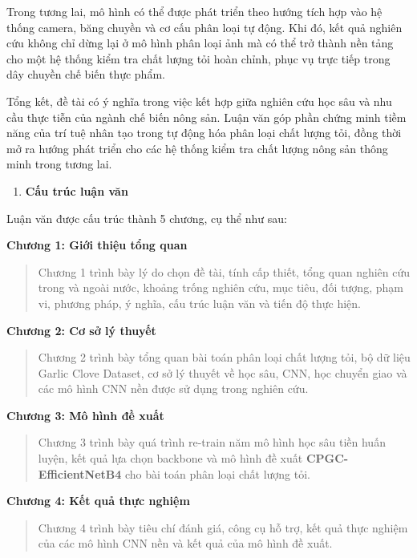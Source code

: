 \documentclass[
]{article}
\begin{document}
Trong tương lai, mô hình có thể được phát triển theo hướng tích hợp vào
hệ thống camera, băng chuyền và cơ cấu phân loại tự động. Khi đó, kết
quả nghiên cứu không chỉ dừng lại ở mô hình phân loại ảnh mà có thể trở
thành nền tảng cho một hệ thống kiểm tra chất lượng tỏi hoàn chỉnh, phục
vụ trực tiếp trong dây chuyền chế biến thực phẩm.

Tổng kết, đề tài có ý nghĩa trong việc kết hợp giữa nghiên cứu học sâu
và nhu cầu thực tiễn của ngành chế biến nông sản. Luận văn góp phần
chứng minh tiềm năng của trí tuệ nhân tạo trong tự động hóa phân loại
chất lượng tỏi, đồng thời mở ra hướng phát triển cho các hệ thống kiểm
tra chất lượng nông sản thông minh trong tương lai.

\begin{enumerate}
\def\labelenumi{\arabic{enumi}.}
\setcounter{enumi}{5}
\item
  \protect{}\label{_Toc232111993}{}\textbf{Cấu trúc luận văn}
\end{enumerate}

Luận văn được cấu trúc thành 5 chương, cụ thể như sau:

\textbf{Chương 1: Giới thiệu tổng quan}

\begin{quote}
Chương 1 trình bày lý do chọn đề tài, tính cấp thiết, tổng quan nghiên
cứu trong và ngoài nước, khoảng trống nghiên cứu, mục tiêu, đối tượng,
phạm vi, phương pháp, ý nghĩa, cấu trúc luận văn và tiến độ thực hiện.
\end{quote}

\textbf{Chương 2: Cơ sở lý thuyết}

\begin{quote}
Chương 2 trình bày tổng quan bài toán phân loại chất lượng tỏi, bộ dữ
liệu Garlic Clove Dataset, cơ sở lý thuyết về học sâu, CNN, học chuyển
giao và các mô hình CNN nền được sử dụng trong nghiên cứu.
\end{quote}

\textbf{Chương 3: Mô hình đề xuất}

\begin{quote}
Chương 3 trình bày quá trình re-train năm mô hình học sâu tiền huấn
luyện, kết quả lựa chọn backbone và mô hình đề xuất
\textbf{CPGC-EfficientNetB4} cho bài toán phân loại chất lượng tỏi.
\end{quote}

\textbf{Chương 4: Kết quả thực nghiệm}

\begin{quote}
Chương 4 trình bày tiêu chí đánh giá, công cụ hỗ trợ, kết quả thực
nghiệm của các mô hình CNN nền và kết quả của mô hình đề xuất.
\end{quote}
\end{document}
